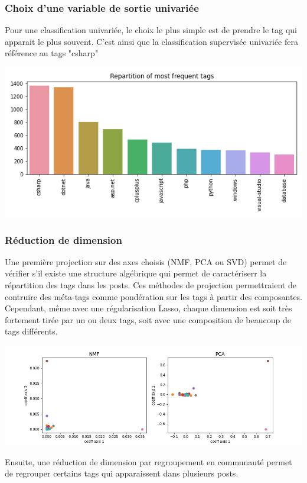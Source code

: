 \documentclass[a4paper,11pt]{article}
\begin{document}
\subsubsection*{Choix d'une variable de sortie univariée}
Pour une classification univariée, le choix le plus simple est de prendre le tag qui apparait le plus souvent. C'est ainsi que la classification supervisée univariée fera référence au tags "csharp"
\begin{center}
   \includegraphics[width=0.8\linewidth]{figures/most_freq_tags.png}
\end{center}

\subsubsection*{Réduction de dimension}
Une première projection sur des axes choisis (NMF, PCA ou SVD) permet de vérifier s'il existe une structure algébrique qui permet de caractériserr la répartition des tags dans les posts. Ces méthodes de projection permettraient de contruire des méta-tags comme pondération sur les tags à partir des composantes. Cependant, même avec une régularisation Lasso, chaque dimension est soit très fortement tirée par un ou deux tags, soit avec une composition de beaucoup de tags différents. 

\begin{center}
   \includegraphics[width=0.8\linewidth]{figures/tags_NMF_PCA_coeffs12.jpg}
\end{center}

Ensuite, une réduction de dimension par regroupement en communauté permet de regrouper certains tags qui apparaissent dans plusieurs posts. 
\end{document}

